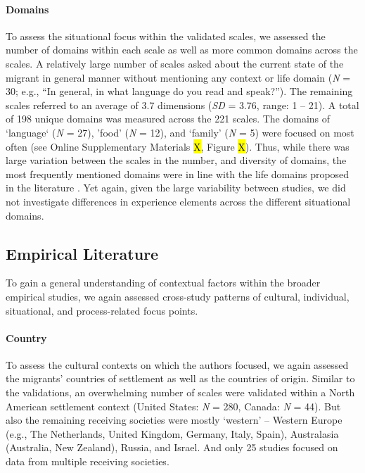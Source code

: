 \paragraph{Domains}

To assess the situational focus within the validated scales, we assessed
the number of domains within each scale as well as more common domains
across the scales. A relatively large number of scales asked about the
current state of the migrant in general manner without mentioning any
context or life domain (\textit{N} = 30; e.g., ``In general, in what
language do you read and speak?''). The remaining scales referred to an
average of 3.7 dimensions (\textit{SD} = 3.76, range: 1 -- 21). A total
of 198 unique domains was measured across the 221 scales. The domains of
`language` (\textit{N} = 27), 'food' (\textit{N} = 12), and `family'
(\textit{N} = 5) were focused on most often (see Online Supplementary
Materials \hl{X}, Figure \hl{X}). Thus, while there was large variation
between the scales in the number, and diversity of domains, the most
frequently mentioned domains were in line with the life domains proposed
in the literature \citep[e.g.,][]{Arends-Toth2007}. Yet again, given the
large variability between studies, we did not investigate differences in
experience elements across the different situational domains.

\subsection{Empirical Literature}

To gain a general understanding of contextual factors within the broader
empirical studies, we again assessed cross-study patterns of cultural,
individual, situational, and process-related focus points.

\paragraph{Country}

To assess the cultural contexts on which the authors focused, we again
assessed the migrants' countries of settlement as well as the countries
of origin. Similar to the validations, an overwhelming number of scales
were validated within a North American settlement context (United
States: \textit{N} = 280, Canada: \textit{N} = 44). But also the
remaining receiving societies were mostly `western' -- Western Europe
(e.g., The Netherlands, United Kingdom, Germany, Italy, Spain),
Australasia (Australia, New Zealand), Russia, and Israel. And only 25
studies focused on data from multiple receiving societies.

